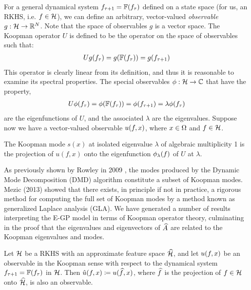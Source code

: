 For a general dynamical system $f_{\tau+1} = \mathbb{F}(f_{\tau})$ defined on a state space (for us, an RKHS, i.e. $f\in\mathcal{H}$), we can define an arbitrary, vector-valued \emph{observable} $g : \mathcal{H} \to \mathbb{R}^{N}$. Note that the space of observables $g$ is a vector space. The Koopman operator $U$ is defined to be the operator on the space of observables such that:
\begin{align} \eqlabel{koopman_operator}
U g(f_{\tindex}) = g(\mathbb{F}(f_{\tindex})) = g(f_{\tindex+1})
\end{align}
This operator is clearly linear from its definition, and thus it is reasonable to examine its spectral properties. The special observables $\phi : \mathcal{H} \to \mathbb{C}$ that have the property,
\begin{align} \eqlabel{koopman_eigenfunctions}
U \phi(f_{\tindex}) = \phi(\mathbb{F}(f_{\tindex})) = \phi(f_{\tindex+1}) = \lambda \phi(f_{\tindex})
\end{align}
are the eigenfunctions of $U$, and the associated $\lambda$ are the eigenvalues. Suppose now we have a vector-valued observable $u(f,x)$, where $x\in\Omega$ and $f\in\mathcal{H}$.

\begin{definition}
	The Koopman mode $s(x)$ at isolated eigenvalue $\lambda$ of algebraic multiplicity 1 is the projection of $u(f,x)$ onto the eigenfunction $\phi_{\lambda}(f)$ of $U$ at $\lambda$. \cite{mezic2013analysis}
\end{definition}

As previously shown by Rowley in 2009 \cite{rowley2009spectral}, the modes produced by the Dynamic Mode Decomposition (DMD) algorithm constitute a subset of Koopman modes. Mezic (2013) \cite{mezic2013analysis} showed that there exists, in principle if not in practice, a rigorous method for computing the full set of Koopman modes by a method known as generalized Laplace analysis (GLA). We have generated a number of results interpreting the E-GP model in terms of Koopman operator theory, culminating in the proof that the eigenvalues and eigenvectors of $\widehat{A}$ are related to the Koopman eigenvalues and modes.

\begin{proposition}\label{thm:ApproxObsv}
	Let $\mathcal{H}$ be a RKHS with  an approximate feature space $\widehat{\mathcal{H}}$, and let $u(f,x)$ be an observable in the Koopman sense with respect to the dynamical system $f_{\tau+1} = \mathbb{F}(f_{\tau})$ in $\mathcal{H}$. Then $\hat u(f,x) \coloneqq u(\widehat{f},x)$, where $\widehat{f}$ is the projection of $f\in\mathcal{H}$ onto $\widehat{\mathcal{H}}$, is also an observable.
\end{proposition}


